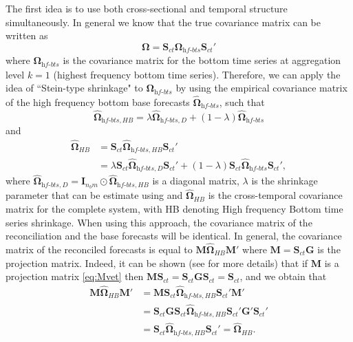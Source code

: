 \documentclass[a4paper,11pt]{article}
\newcommand{\Gvet}{\bm{G}}
\newcommand{\Ivet}{\bm{I}}
\newcommand{\Mvet}{\bm{M}}
\newcommand{\Svet}{\bm{S}}
\newcommand{\Omegavet}{\bm{\Omega}}
\theoremstyle{definition}
\begin{document}
The first idea is to use both cross-sectional and temporal structure simultaneously. In general we know that the true covariance matrix can be written as
\begin{equation}
	\label{eq:OmSct}
	\Omegavet= \Svet_{ct}\Omegavet_{\textit{hf-bts}}\Svet_{ct}'
\end{equation}
where $\Omegavet_{\textit{hf-bts}}$ is the covariance matrix for the bottom time series at aggregation level $k = 1$ (highest frequency bottom time series).
Therefore, we can apply the idea of “Stein-type shrinkage" to $\Omegavet_{\textit{hf-bts}}$ by using the empirical covariance matrix of the high frequency bottom base forecasts $\widehat{\Omegavet}_{\textit{hf-bts}}$, such that
$$
	\widehat{\Omegavet}_{\textit{hf-bts}, HB} = \lambda \widehat{\Omegavet}_{\textit{hf-bts}, D} + (1-\lambda) \widehat{\Omegavet}_{\textit{hf-bts}}
$$
and
\begin{align*}
	\widehat{\Omegavet}_{HB} & = \Svet_{ct}\widehat{\Omegavet}_{\textit{hf-bts}, HB}\Svet_{ct}'                                                                        \\
	                         & = \lambda \Svet_{ct}\widehat{\Omegavet}_{\textit{hf-bts}, D}\Svet_{ct}'+ (1-\lambda) \Svet_{ct}\widehat{\Omegavet}_{\textit{hf-bts}}\Svet_{ct}',
\end{align*}
where $\widehat{\Omegavet}_{\textit{hf-bts}, D} = \Ivet_{n_b m}\odot\widehat{\Omegavet}_{\textit{hf-bts}, HB}$ is a diagonal matrix, $\lambda$ is the shrinkage parameter that can be estimate using \cite{schafer2005} and $\widehat{\Omegavet}_{HB}$ is the cross-temporal covariance matrix for the complete system, with HB denoting High frequency Bottom time series shrinkage.
When using this approach, the covariance matrix of the reconciliation and the base forecasts will be identical. In general, the covariance matrix of the reconciled forecasts is equal to $\Mvet \widehat{\Omegavet}_{HB} \Mvet'$ where $\Mvet = \Svet_{ct}\Gvet$ is the projection matrix. Indeed, it can be shown (see \citealp{panagiotelis2021} for more details) that if $\Mvet$ is a projection matrix \eqref{eq:Mvet} then $\Mvet\Svet_{ct} = \Svet_{ct}\Gvet\Svet_{ct} = \Svet_{ct}$, and we obtain that
$$
	\begin{aligned}
		\Mvet \widehat{\Omegavet}_{HB} \Mvet' & = \Mvet\Svet_{ct}\widehat{\Omegavet}_{\textit{hf-bts}, HB}\Svet_{ct}'\Mvet'                      \\
		                                      & = \Svet_{ct}\Gvet\Svet_{ct}\widehat{\Omegavet}_{\textit{hf-bts}, HB}\Svet_{ct}'\Gvet'\Svet_{ct}' \\
		                                      & = \Svet_{ct}\widehat{\Omegavet}_{\textit{hf-bts}, HB}\Svet_{ct}' = \widehat{\Omegavet}_{HB}.
	\end{aligned}
$$
\end{document}
